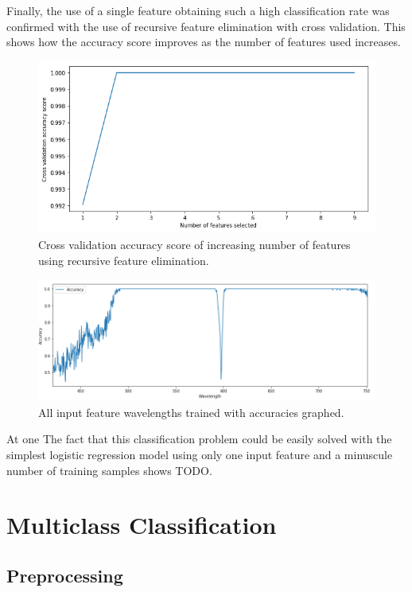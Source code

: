 \documentclass{article}
\begin{document}
Finally, the use of a single feature obtaining such a high classification rate was confirmed with the use of recursive feature elimination with cross validation. This shows how the accuracy score improves as the number of features used increases.
\begin{figure}[H]
\centering
\includegraphics[width=1\textwidth, keepaspectratio]{imgs/binary-numfeatures.png}
\caption{Cross validation accuracy score of increasing number of features using recursive feature elimination.}
\end{figure}
\noindent

\begin{figure}[H]
\centering
\includegraphics[width=1\textwidth]{imgs/binary-accuracy.png}
\caption{All input feature wavelengths trained with accuracies graphed.}
\end{figure}
\noindent

At one 
The fact that this classification problem could be easily solved with the simplest logistic regression model using only one input feature and a minuscule number of training samples shows TODO. 
\section{Multiclass Classification}

\subsection{Preprocessing}
\end{document}
